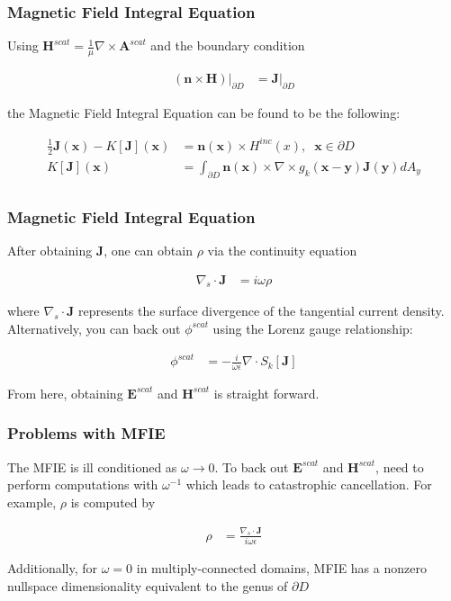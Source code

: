 \documentclass{beamer}
\newcommand{\bvec}[1]{\boldsymbol{#1}}
\begin{document}
	\begin{frame}
	\frametitle{Magnetic Field Integral Equation}
	Using $\bvec{H}^{scat} = \frac{1}{\mu} \nabla \times \bvec{A}^{scat}$ and the boundary condition
	
	\begin{align*}
	\left.\left(\bvec{n} \times \bvec{H} \right)\right|_{\partial D} &= \left.\bvec{J}\right|_{\partial D}
	\end{align*}
	
	the Magnetic Field Integral Equation can be found to be the following:
	
	\begin{align*}
	\frac{1}{2} \bvec{J}(\bvec{x}) - K[\bvec{J}](\bvec{x}) &= \bvec{n}(\bvec{x}) \times H^{inc}(x), \;\; \bvec{x} \in \partial D \\
	K[\bvec{J}](\bvec{x}) &= \int_{\partial D} \bvec{n}(\bvec{x}) \times \nabla \times g_k(\bvec{x} - \bvec{y}) \bvec{J}(\bvec{y}) dA_y \\
	\end{align*}
	
	\end{frame}

	\begin{frame}
	\frametitle{Magnetic Field Integral Equation}
	After obtaining $\bvec{J}$, one can obtain $\rho$ via the continuity equation
	
	\begin{align*}
	\nabla_s \cdot \bvec{J} &= i \omega \rho
	\end{align*}
	
	where $\nabla_s \cdot \bvec{J}$ represents the surface divergence of the tangential current density. Alternatively, you can back out $\phi^{scat}$ using the Lorenz gauge relationship:
	
	\begin{align*}
	\phi^{scat} &= -\frac{i}{\omega \epsilon} \nabla \cdot S_k[\bvec{J}]
	\end{align*} 
	
	From here, obtaining $\bvec{E}^{scat}$ and $\bvec{H}^{scat}$ is straight forward.
	
	\end{frame}


	\begin{frame}
	\frametitle{Problems with MFIE}
	The MFIE is ill conditioned as $\omega \rightarrow 0$. To back out $\bvec{E}^{scat}$ and $\bvec{H}^{scat}$, need to perform computations with $\omega^{-1}$ which leads to catastrophic cancellation. For example, $\rho$ is computed by
	
	\begin{align*}
	\rho &= \frac{\nabla_s \cdot \bvec{J}}{i \omega \epsilon}
	\end{align*}
	
	Additionally, for $\omega = 0$ in multiply-connected domains, MFIE has a nonzero nullspace dimensionality equivalent to the genus of $\partial D$
	
	\end{frame}
	
\end{document}
